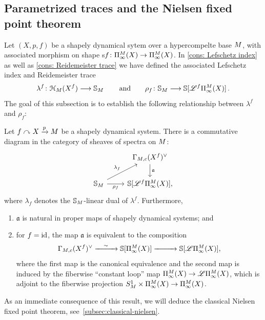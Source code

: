 \subsection{Parametrized traces and the Nielsen fixed point theorem}

Let $(X,p,f)$ be a shapely dynamical sytem over a hypercompelte base $M$, with associated
morphism on shape s$f\colon \ani{X}[\base]\to \ani{X}[\base]$. 
In  \cref{cons: Lefschetz index} as well as \cref{cons: Reidemeister trace}
we have defined the associated Lefschetz index and Reidemeister trace
\begin{equation}
  \label{eq:nielsenthy-intro-characters}
  \lambda^f\colon \cptSec{X^f}[\base]\too \SS_\base\,
  \qquad\text{and}\qquad\rho_{f}\colon \SS_\base \too \SS [\cL^{f}\ani{\tset}[\base]]\,.
\end{equation}
The goal of this subsection is to establish the following relationship between $\lambda^f$ and $\rho_{f}$:
\begin{thm}\label{thm: lefschetz-nielsen}
  Let $f\curvearrowright X\xrightarrow pM$ be a shapely dynamical system. There is a commutative diagram in the category of sheaves of spectra on $M$:
  \[\begin{tikzcd}
      &  \pbmsec{X^f}{\base}\\
      \SS_\base & {\SS [\cL^{f}\ani{\tset}[\base]]},
      \arrow["\mathfrak a", from=1-2, to=2-2]
      \arrow["{\lambda_f}", from=2-1, to=1-2]
      \arrow["{\rho_f}"', from=2-1, to=2-2]
    \end{tikzcd}\]
  where $\lambda_f$ denotes the $\mathbb{S}_M$-linear dual of $\lambda^f$. Furthermore,
  \begin{enumerate}[label=(\roman*)]
  \item $\mathfrak a$ is natural in proper maps of shapely dynamical systems; and
  \item for $f = \operatorname{id}$, the map $\mathfrak a$ is equivalent to the composition
    \[
      \pbmsec{X^f}{\base}\xtoo\sim\SS\lbrack \ani{\tset}[\base]\rbrack\xtoo{\hphantom{\sim}} \SS\lbrack \cL \ani{\tset}[\base]\rbrack,
    \]
    where the first map is the canonical equivalence and the second map is induced by the fiberwise ``constant loop'' map $\ani{\tset}[\base]\to \cL \ani{\tset}[\base]$, which is adjoint to the fiberwise projection $S_\base^1\times \ani{\tset}[\base]\to \ani{\tset}[\base]$.
  \end{enumerate}
\end{thm}
As an immediate consequence of this result, we will deduce the classical Nielsen fixed point theorem, see~\cref{subsec:classical-nielsen}.

